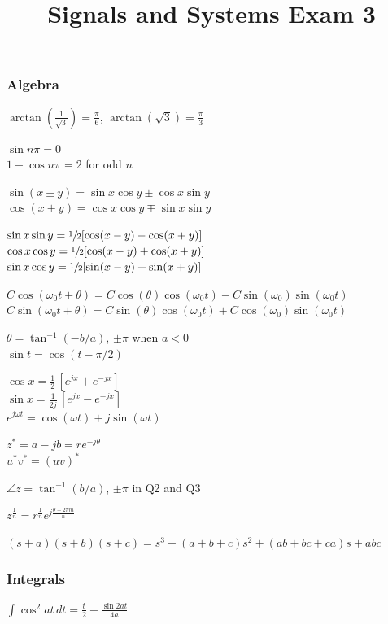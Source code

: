 \documentclass[4pt]{article}
\title{Signals and Systems Exam 3}
\theoremstyle{definition}
\theoremstyle{definition}
\renewcommand{\o}{\omega}
\begin{document}
\begin{landscape}
\raggedright
\begin{multicols}{3} %
\raggedcolumns
\subsubsection*{Algebra}
    $\arctan(\frac{1}{\sqrt{3}}) = \frac{\pi}{6}$,  $\arctan(\sqrt{3}) = \frac{\pi} 3$

    $\sin n\pi = 0$\\
    $1-\cos n\pi = 2$ for odd $n$

    $\sin(x\pm y) = \sin x \cos y \pm \cos x \sin y$\\
    $\cos(x\pm y) = \cos x \cos y \mp \sin x \sin y$

    $\sin x \sin y = \sfrac{1}{2}[\cos(x-y) - \cos(x+y)]$\\ %
    $\cos x \cos y = \sfrac{1}{2}[\cos(x-y) + \cos(x+y)]$\\
    $\sin x \cos y = \sfrac{1}{2}[\sin(x-y) + \sin(x+y)]$

    $C \cos(\o_0 t + \theta) = C\cos(\theta) \cos(\o_0 t) - C\sin(\o_0)\sin(\o_0 t)$\\        %
    $C \sin(\o_0 t + \theta) = C\sin(\theta) \cos(\o_0 t) + C\cos(\o_0)\sin(\o_0 t)$

    $\theta = \tan^{-1} (-b/a)$, $\pm \pi$ when $a<0$\\
    $\sin t = \cos (t-\pi/2)$

    $\cos x = \frac{1}{2}\,[e^{jx} + e^{-jx}]$\\
    $\sin x = \frac{1}{2j}\, [e^{jx} - e^{-jx}]$\\
    $e^{j\o t} = \cos(\o t) + j\sin (\o t)$

    $z^* = a-jb = re^{-j\theta}$\\
    $u^* v^* = (uv)^*$

    $\angle z = \tan^{-1}(b/a)$, $\pm \pi$ in Q2 and Q3

    $z^{\frac 1 n} = r^{\frac 1 n} e^{j \frac{\theta + 2\pi m}{n}}$

    \((s+a)(s+b)(s+c) = s^3 + (a+b+c) s^2 + (ab+bc+ca)s + abc\)
\subsubsection*{Integrals}
    $\int \cos^2 at \, dt = \frac{t}{2} + \frac{\sin2at}{4a}$


\end{multicols}
\end{landscape}
\end{document}
